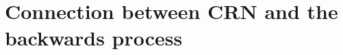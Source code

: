 \documentclass[12pt]{article}
\theoremstyle{plain}%
\theoremstyle{definition}
\newtheorem{numexmp}{Numerical Example}[section]
\def\unif{\mathrm{Unif}}
\begin{document}
%	
%	
%	

	
	\section{Connection between CRN and the backwards process}\label{subsec:backwardsprocess}
\end{document}
